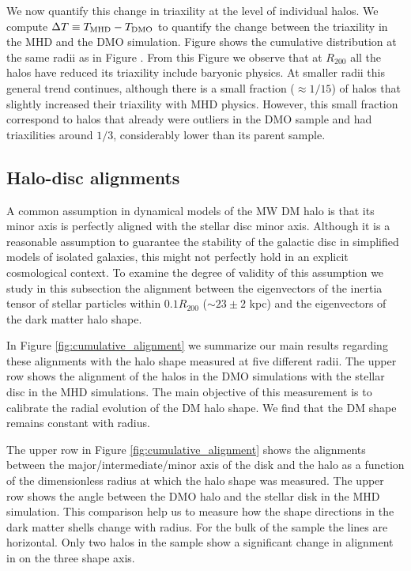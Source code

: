 \documentclass[usenatbib]{mnras}
\begin{document}
We now quantify this change in triaxility at the level of individual halos.
We compute $\Delta T\equiv T_{\rm MHD}-T_{\rm DMO}$ to quantify the
change between the triaxility in the MHD and the DMO simulation.
Figure \label{fig:delta_triaxial_cumulative} shows the cumulative
distribution at the same radii as in
Figure \label{fig:delta_triaxial_cumulative}.  
From this Figure we observe that at $R_{200}$ all the halos have
reduced its triaxility include baryonic physics.
At smaller radii this general trend continues, although there is a
small fraction ($\approx 1/15$) of halos that slightly increased their
triaxility with MHD physics. 
However, this small fraction correspond to halos that already were
outliers in the DMO sample and had triaxilities around $1/3$,
considerably lower than its parent sample.


\subsection{Halo-disc alignments}

A common assumption in dynamical models of the MW DM halo is that
its minor axis is perfectly aligned with the stellar disc minor axis.
Although it is a reasonable assumption to guarantee the stability of
the galactic disc in simplified models of isolated galaxies, this
might not perfectly hold in an explicit cosmological context. 
To examine the degree of validity of this assumption we study in this
subsection the alignment between the eigenvectors of the inertia tensor of
stellar particles within $0.1R_{200}$ ($\sim 23\pm 2$ kpc) and the
eigenvectors of the dark matter halo shape.

In Figure \ref{fig:cumulative_alignment} we summarize our main results
regarding these alignments with the halo shape measured at five
different radii.
The upper row shows the alignment of the halos in the DMO simulations
with the stellar disc in the MHD simulations.
The main objective of this measurement is to calibrate the radial
evolution of the DM halo shape. 
We find that the DM shape remains constant with radius.

The upper row in Figure \ref{fig:cumulative_alignment} shows 
the alignments between the major/intermediate/minor axis of the
disk and the halo as a function of the dimensionless radius at which
the halo shape was measured.
The upper row shows the angle between the DMO halo and the stellar
disk in the MHD simulation.
This comparison help us to measure how the shape directions in the
dark matter shells change with radius.
For the bulk of the sample the lines are horizontal.
Only two halos in the sample show a significant change in alignment in
on the three shape axis.
\end{document}
